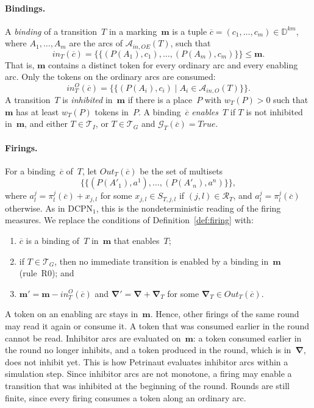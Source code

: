 \documentclass[11pt]{article}
\theoremstyle{definition}
\newcommand{\Dom}{\mathbb{D}}
\newcommand{\mset}[1]{\{\!\{#1\}\!\}}
\newcommand{\cvec}{\overline{c}}
\newcommand{\bfm}{\mathbf{m}}
\newcommand{\bfNabla}{\boldsymbol{\nabla}}
\newcommand{\DCPN}[1]{\texorpdfstring{\textup{DCPN}\ensuremath{_{#1}}}{DCPN#1}}
\begin{document}
\paragraph{Bindings.}
A \emph{binding} of a transition~$T$ in a marking~$\bfm$ is a tuple
$\cvec = (c_1, \dots, c_m) \in \Dom^{km}$, where $A_1, \dots, A_m$ are the
arcs of $\mathcal{A}_{\mathit{in},OE}(T)$, such that
\[
  \mathit{in}_T(\cvec) = \mset{(P(A_1), c_1), \dots, (P(A_m), c_m)} \le \bfm.
\]
That is, $\bfm$ contains a distinct token for every ordinary arc and every
enabling arc. Only the tokens on the ordinary arcs are consumed:
\[
  \mathit{in}^O_T(\cvec) = \mset{(P(A_i), c_i) \mid A_i \in
  \mathcal{A}_{\mathit{in},O}(T)}.
\]
A transition~$T$ is \emph{inhibited}
in~$\bfm$ if there is a place~$P$ with $w_T(P) > 0$ such that $\bfm$ has at
least $w_T(P)$ tokens in~$P$. A binding~$\cvec$ \emph{enables}~$T$ if $T$ is
not inhibited in~$\bfm$, and either $T \in \mathcal{T}_I$, or
$T \in \mathcal{T}_G$ and $\mathcal{G}_T(\cvec) = \mathit{True}$.

\paragraph{Firings.}
For a binding~$\cvec$ of~$T$, let $\mathit{Out}_T(\cvec)$ be the set of
multisets
\[
  \mset{(P(A'_1), a^1), \dots, (P(A'_n), a^n)},
\]
where
$a^j_l = \pi^j_l(\cvec) + x_{j, l}$ for some $x_{j, l} \in S_{T, j, l}$ if
$(j, l) \in \mathcal{R}_T$, and $a^j_l = \pi^j_l(\cvec)$ otherwise. As in
\DCPN{1}, this is the nondeterministic reading of the firing measures. We
replace the conditions of Definition~\ref{def:firing} with:
\begin{enumerate}
  \item $\cvec$ is a binding of~$T$ in~$\bfm$ that enables~$T$;
  \item if $T \in \mathcal{T}_G$, then no immediate transition is enabled by
    a binding in~$\bfm$ (rule~R0); and
  \item $\bfm' = \bfm - \mathit{in}^O_T(\cvec)$ and
    $\bfNabla' = \bfNabla + \bfNabla_T$ for some
    $\bfNabla_T \in \mathit{Out}_T(\cvec)$.
\end{enumerate}

A token on an enabling arc stays in~$\bfm$. Hence, other firings of the same
round may read it again or consume it. A token that was consumed earlier in
the round cannot be read. Inhibitor arcs are evaluated on~$\bfm$: a token
consumed earlier in the round no longer inhibits, and a token produced in the
round, which is in~$\bfNabla$, does not inhibit yet. This is how Petrinaut
evaluates inhibitor arcs within a simulation step. Since inhibitor arcs are
not monotone, a firing may enable a transition that was inhibited at the
beginning of the round. Rounds are still finite, since every firing consumes
a token along an ordinary arc.
\end{document}
